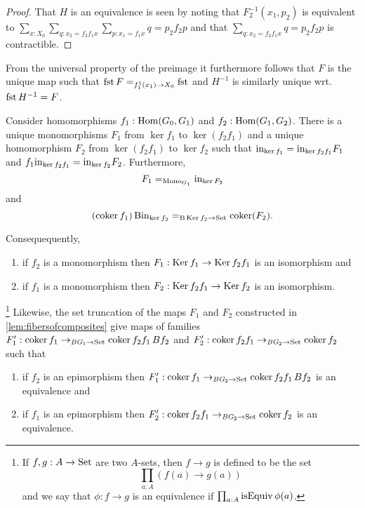 \begin{proof}
  That $H$ is an equivalence is seen by noting that $F_2^{-1}(x_1,p_2)$ is equivalent to
  $\sum_{x:X_0}\sum_{q:x_2=f_2f_1x}\sum_{p:x_1=f_1x}q=p_2f_2p$ and that $\sum_{q:x_2=f_2f_1x}q=p_2f_2p$ is contractible.
\end{proof}
From the universal property of the preimage it furthermore follows that $F$ is the unique map such that $\fst F=_{f_1^{\-1}(x_1)\to X_0}\fst$ and $H^{-1}$ is similarly unique wrt. $\fst H^{-1}=F$.

\begin{corollary}
  \label{cor:cokermaps}
  Consider homomorphisms $f_1:\Hom(G_0,G_1)$ and $f_2:\Hom(G_1,G_2)$.
  There is a unique monomorphisms $F_1$ from $\ker f_1$ to $\ker(f_2f_1)$ and a unique homomorphism $F_2$ from $\ker(f_2f_1)$ to $\ker f_2$ such that $\incl_{\ker f_1}=\incl_{\ker f_2f_1}F_1$ and $f_1\incl_{\ker f_2f_1}=\incl_{\ker f_2}F_2$.
  Furthermore, $$F_1=_{\typemono_{G_1}}\incl_{\ker F_2}$$ and $$(\coker f_1)\,\B\incl_{\ker f_2}=_{\B\Ker f_2\to\Set}\coker (F_2).$$

  Consequequently,
  \begin{enumerate}
  \item if $f_2$ is a monomorphism then $F_1:\Ker f_1\to\Ker f_2f_1$ is an isomorphism and
  \item if $f_1$ is a monomorphism then $F_2:\Ker f_2f_1\to\Ker f_2$ is an isomorphism.
  \end{enumerate}
\footnote{If $f,g:A\to\mathrm{Set}$ are two $A$-sets, then $f\to g$ is defined to be the set $$\prod_{a:A}(f(a)\to g(a))$$ and we say that $\phi:f\to g$ is an equivalence if $\prod_{a:A}\isEq\phi(a)$.}
  Likewise, the set truncation of the maps $F_1$ and $F_2$ constructed in \cref{lem:fibersofcomposites} give maps  of families $F_1':\coker f_1\to_{\BG_1\to\Set}\coker f_2f_1\,Bf_2$ and $F_2':\coker f_2f_1\to_{\BG_2\to\Set}\coker f_2$
  such that
  \begin{enumerate}
  \item if $f_2$ is an epimorphism then $F_1':\coker f_1\to_{\BG_2\to\Set}\coker f_2f_1\,Bf_2$ is an equivalence and
  \item if $f_1$ is an epimorphism then $F_2':\coker f_2f_1\to_{\BG_2\to\Set}\coker f_2$  is an equivalence.
  \end{enumerate}
\end{corollary}
